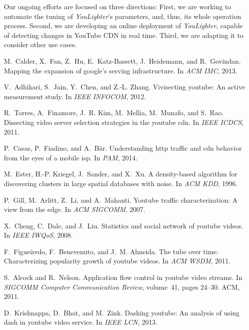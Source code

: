 \documentclass{acm_proc_article-sp}
\newcommand{\tool}{\textit{YouLighter}\xspace}
\begin{document}
Our ongoing efforts are focused on three directions: First, we are working to automate the tuning of \tool's parameters, and, thus, its whole operation process. Second, we are developing an online deployment of \tool, capable of detecting changes in YouTube CDN in real time. Third, we are adapting it to consider other use cases.




\begin{thebibliography}{10}

M.~Calder, X.~Fan, Z.~Hu, E.~Katz-Bassett, J.~Heidemann, and R.~Govindan.
\newblock Mapping the expansion of google's serving infrastructure.
\newblock In {\em ACM IMC}, 2013.

V.~Adhikari, S.~Jain, Y.~Chen, and Z.-L. Zhang.
\newblock Vivisecting youtube: An active measurement study.
\newblock In {\em IEEE INFOCOM}, 2012.

R.~Torres, A.~Finamore, J.~R. Kim, M.~Mellia, M.~Munafo, and S.~Rao.
\newblock Dissecting video server selection strategies in the youtube cdn.
\newblock In {\em IEEE ICDCS}, 2011.

P.~Casas, P.~Fiadino, and A.~B{\"a}r.
\newblock Understanding http traffic and cdn behavior from the eyes of a mobile
  isp.
\newblock In {\em PAM}, 2014.

M.~Ester, H.-P. Kriegel, J.~Sander, and X.~Xu.
\newblock A density-based algorithm for discovering clusters in large spatial
  databases with noise.
\newblock In {\em ACM KDD}, 1996.

P.~Gill, M.~Arlitt, Z.~Li, and A.~Mahanti.
\newblock Youtube traffic characterization: A view from the edge.
\newblock In {\em ACM SIGCOMM}, 2007.

X.~Cheng, C.~Dale, and J.~Liu.
\newblock Statistics and social network of youtube videos.
\newblock In {\em IEEE IWQoS}, 2008.

F.~Figueiredo, F.~Benevenuto, and J.~M. Almeida.
\newblock The tube over time: Characterizing popularity growth of youtube
  videos.
\newblock In {\em ACM WSDM}, 2011.

S.~Alcock and R.~Nelson.
\newblock Application flow control in youtube video streams.
\newblock In {\em SIGCOMM Computer Communication Review}, volume~41, pages
  24--30. ACM, 2011.

D.~Krishnappa, D.~Bhat, and M.~Zink.
\newblock Dashing youtube: An analysis of using dash in youtube video service.
\newblock In {\em IEEE LCN}, 2013.


\end{thebibliography}
\end{document}
